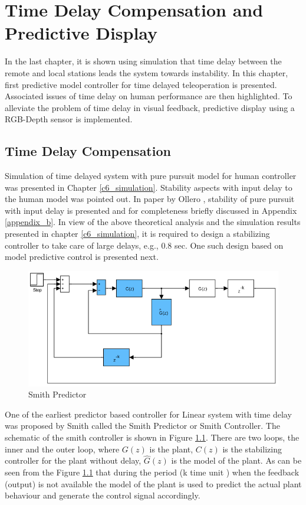 \chapter{Time Delay Compensation and Predictive Display}
\label{ch_7:PDsply}
In the last chapter, it is shown using simulation that time delay between the remote and local stations leads the system towards instability. In this chapter, first  predictive model controller for time delayed teleoperation is presented. Associated issues of time delay on human performance are then highlighted. To alleviate the problem of time delay in visual feedback, predictive display using a RGB-Depth sensor is  implemented.

\section {Time Delay Compensation}
Simulation of time delayed system with pure pursuit model for human controller was presented in Chapter \ref{c6_simulation}.  Stability aspects with input delay to the human model was pointed out. In paper by Ollero \cite{ollero1995stability}, stability of pure pursuit with input delay is presented and for completeness briefly discussed in Appendix \ref{appendix_b}.   In view of the above theoretical analysis and the simulation results presented in chapter \ref{c6_simulation}, it is required to design  a stabilizing controller to take care of large delays, e.g.,  0.8 sec. One such design based on model  predictive control is presented next.

 \begin{figure}
 	\includegraphics[width=\linewidth]{Chapter7/fig/Smith_predictor}
 	\caption{Smith Predictor \cite{smith1959controller}}
 	\label{fig:Smith}
 \end{figure}
 
 One of the earliest predictor based controller for Linear system with time delay  was proposed by Smith \cite{smith1959controller} called the Smith Predictor or Smith Controller. The schematic of the smith controller is shown in Figure \ref{fig:Smith}. There are two loops, the inner and the outer loop, where $G(z)$ is the plant, $C(z)$ is the stabilizing controller  for the plant without delay, $\hat{G}(z)$ is the model of the plant.  As can be seen from the Figure \ref{fig:Smith} that during the period (k time unit ) when the feedback (output) is not available the model of the plant is used to predict the actual plant behaviour and generate the control signal accordingly. 
 
